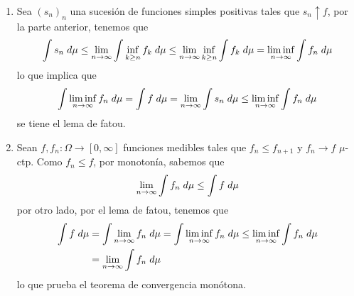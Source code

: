\documentclass{article}
\begin{document}
\begin{enumerate}
    \item Sea $(s_{n})_{n}$ una sucesión de funciones simples positivas tales que 
    $s_{n}\uparrow f$, por la parte anterior, tenemos que
    \begin{equation*}
        \int s_{n}\hspace{1mm}d\mu\leq\lim\limits_{n\to\infty}\int \inf_{k\geq n}
        f_{k}\hspace{1mm}d\mu\leq\lim\limits_{n\to\infty}\inf_{k\geq n}\int f_{k}\hspace{1mm}d\mu
        =\liminf\limits_{n\to\infty}\int f_{n}\hspace{1mm}d\mu
    \end{equation*}
    lo que implica que
    \begin{equation*}
        \int \liminf\limits_{n\to\infty}f_{n}\hspace{1mm}d\mu=\int f\hspace{1mm}d\mu
        =\lim\limits_{n\to\infty}\int s_{n}\hspace{1mm}d\mu
        \leq\liminf\limits_{n\to\infty}\int f_{n}\hspace{1mm}d\mu
    \end{equation*}
    se tiene el lema de fatou.

    \item Sean $f,f_{n}:\Omega\to[0,\infty]$ funciones medibles tales que $f_{n}\leq f_{n+1}$ y
    $f_{n}\to f$ $\mu$-ctp. Como $f_{n}\leq f$, por monotonía, sabemos que
    \begin{equation*}
        \lim\limits_{n\to\infty}\int f_{n}\hspace{1mm}d\mu\leq\int f\hspace{1mm}d\mu
    \end{equation*}
    por otro lado, por el lema de fatou, tenemos que
    \begin{align*}
        \int f\hspace{1mm}d\mu &= \int \lim\limits_{n\to\infty}f_{n}\hspace{1mm}d\mu
        =\int \liminf\limits_{n\to\infty}f_{n}\hspace{1mm}d\mu
        \leq\liminf\limits_{n\to\infty}\int f_{n}\hspace{1mm}d\mu \\
        &= \lim\limits_{n\to\infty}\int f_{n}\hspace{1mm}d\mu
    \end{align*}
    lo que prueba el teorema de convergencia monótona.
\end{enumerate}
\end{document}
